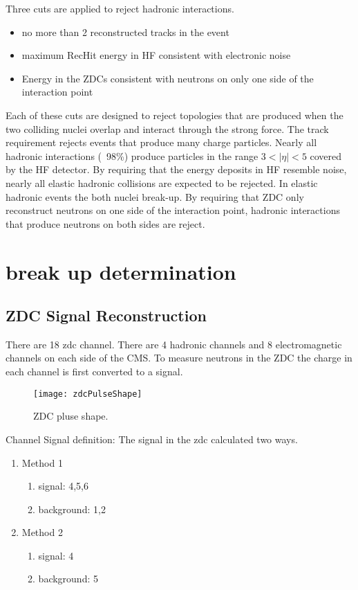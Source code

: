     Three cuts are applied to reject hadronic interactions. 
    \begin{itemize}
	    \item no more than 2 reconstructed tracks in the event
	    \item maximum RecHit energy in HF consistent with electronic noise 
	    \item Energy in the ZDCs consistent with neutrons on only one side 
		    of the interaction point
    \end{itemize}
    Each of these cuts are designed to reject topologies that are produced when
      the two colliding nuclei overlap and interact through the strong force. 
    The track requirement rejects events that produce many charge particles.
    Nearly all hadronic interactions (~98\%) produce particles in the 
      range $3<|\eta|<5$ covered by the HF detector.
    By requiring that the energy deposits in HF resemble noise, nearly all
      elastic hadronic collisions are expected to be rejected.
    In elastic hadronic events the both nuclei break-up. 
    By requiring that ZDC only reconstruct neutrons on one side of the 
      interaction point, hadronic interactions that produce neutrons on both 
      sides are reject.

  \section{break up determination}
    \subsection{ZDC Signal Reconstruction}
      There are 18 zdc channel. 
      There are 4 hadronic channels and 8 electromagnetic channels on each side
        of the CMS. 
      To measure neutrons in the ZDC the charge in each channel is first 
        converted to a signal. 

	\begin{figure}[h]
		\centering
		\texttt{[image: zdcPulseShape]}
		\caption{ZDC pluse shape.}
		\label{fig:zdcPulseShape}
	\end{figure}

      Channel Signal definition:
      The signal in the zdc calculated two ways. 
      \begin{enumerate}
	\item Method 1
	\begin{enumerate}
	  \item signal: 4,5,6 
          \item background: 1,2
        \end{enumerate}
	\item Method 2
	\begin{enumerate}
	  \item signal: 4
	  \item background: 5
        \end{enumerate}
      \end{enumerate}

